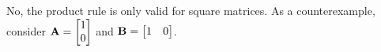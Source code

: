 \begin{sol}
    No, the product rule is only valid for square matrices. As a counterexample, consider $\mathbf{A} = \begin{bmatrix}
        1 \\ 0
    \end{bmatrix}$ and $\mathbf{B} = \begin{bmatrix}
        1 & 0
    \end{bmatrix}$.
\end{sol}